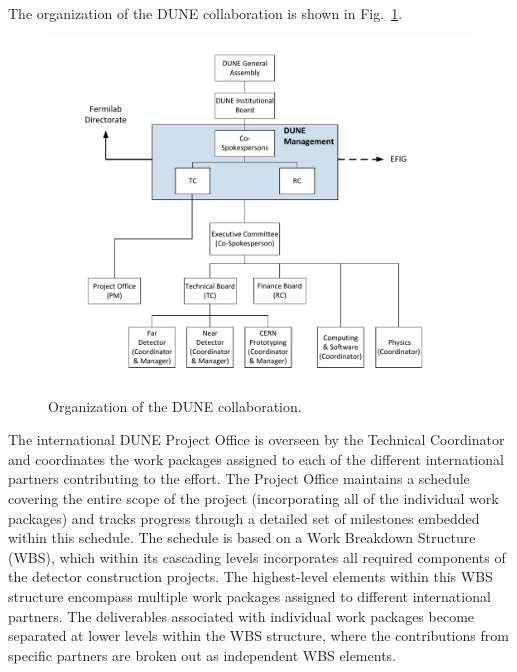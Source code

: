 The organization of the DUNE collaboration is shown in Fig.~\ref{fig:DuneOrg}.  
%
\begin{figure}[htb]
  \centering
\includegraphics[scale=0.7]{figures/150530_DUNE_Collaboration_20150525.pdf}
  \caption{Organization of the DUNE collaboration.}
  \label{fig:DuneOrg}
\end{figure}
%
The international DUNE Project Office is overseen by the Technical Coordinator and coordinates the work packages assigned to each 
of the different international partners contributing to the effort.  The Project Office maintains a schedule covering the entire 
scope of the project (incorporating all of the individual work packages) and tracks progress through a detailed set of milestones 
embedded within this schedule.  The schedule is based on a Work Breakdown Structure (WBS), which within its cascading levels 
incorporates all required components of the detector construction projects.  The highest-level elements within this WBS structure 
encompass multiple work packages assigned to different international partners.  The deliverables associated with individual work 
packages become separated at lower levels within the WBS structure, where the contributions from specific partners are broken out 
as independent WBS elements.


